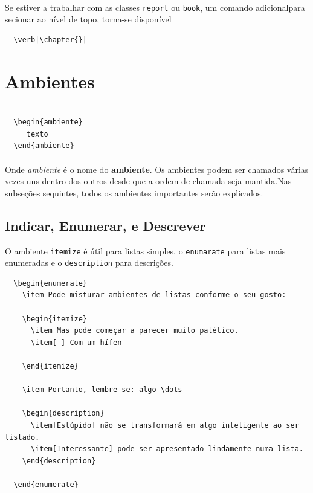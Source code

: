 \documentclass[a4paper,10pt]{report}
\begin{document}
\paragraph{}
Se estiver a trabalhar com as classes \verb|report| ou \verb|book|, um comando adicionalpara secionar ao nível de topo, torna-se disponível
\begin{verbatim}
  \verb|\chapter{}|
\end{verbatim}

\section{Ambientes}

   \begin{verbatim}

  \begin{ambiente}
     texto
  \end{ambiente}
\end{verbatim}

\paragraph{}
Onde \textit{ambiente} é o nome do \textbf{ambiente}. Os ambientes podem ser chamados várias vezes uns dentro dos outros desde que a ordem de chamada seja mantida.Nas subseções sequintes, todos os ambientes importantes serão explicados.


\subsection{Indicar, Enumerar, e Descrever}


O ambiente \verb|itemize| é útil para listas simples, o \verb|enumarate| para listas mais enumeradas e o \verb|description| para descrições.
   \begin{verbatim}
  \begin{enumerate}
    \item Pode misturar ambientes de listas conforme o seu gosto:

    \begin{itemize}
      \item Mas pode começar a parecer muito patético.
      \item[-] Com um hífen

    \end{itemize}

    \item Portanto, lembre-se: algo \dots

    \begin{description}
      \item[Estúpido] não se transformará em algo inteligente ao ser listado.
      \item[Interessante] pode ser apresentado lindamente numa lista.
    \end{description}

  \end{enumerate}
    \end{verbatim}
\end{document}
